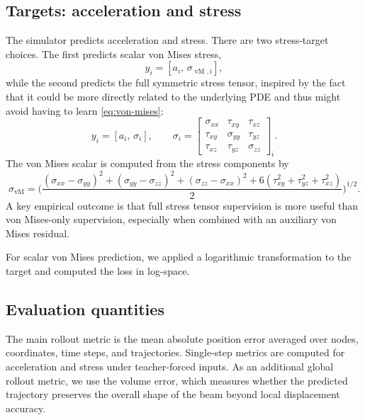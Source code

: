 \documentclass[11pt,a4paper,reqno]{amsart}
\theoremstyle{definition}
\theoremstyle{remark}
\numberwithin{equation}{section}
\newcommand{\vM}{\operatorname{vM}}
\begin{document}
\subsection{Targets: acceleration and stress}

The simulator predicts acceleration and stress. There are two stress-target choices. The first predicts scalar von Mises stress,
\begin{equation}
    y_i = \left[a_i,\, \sigma_{\vM,i}\right],
\end{equation}
while the second predicts the full symmetric stress tensor, inspired by the fact that it could be more directly related to the underlying PDE and thus might avoid having to learn \eqref{eq:von-mises}:
\begin{equation}
    y_i = \left[a_i,\, \sigma_i\right],
    \qquad
    \sigma_i =
    \begin{bmatrix}
        \sigma_{xx} & \tau_{xy} & \tau_{xz}\\
        \tau_{xy} & \sigma_{yy} & \tau_{yz}\\
        \tau_{xz} & \tau_{yz} & \sigma_{zz}
    \end{bmatrix}_i.
\end{equation}
The von Mises scalar is computed from the stress components by
\begin{equation}
    \sigma_{\vM}=\biggl(
        \frac{(\sigma_{xx}-\sigma_{yy})^2
        +(\sigma_{yy}-\sigma_{zz})^2
        +(\sigma_{zz}-\sigma_{xx})^2
        +6(\tau_{xy}^2+\tau_{yz}^2+\tau_{xz}^2)}{2}
    \biggr)^{1/2}.
    \label{eq:von-mises}
\end{equation}
A key empirical outcome is that full stress tensor supervision is more useful than von Mises-only supervision, especially when combined with an auxiliary von Mises residual.

For scalar von Mises prediction, we applied a logarithmic transformation to the target and computed the loss in log-space. 

\subsection{Evaluation quantities}

The main rollout metric is the mean absolute position error averaged over nodes, coordinates, time steps, and trajectories. Single-step metrics are computed for acceleration and stress under teacher-forced inputs. As an additional global rollout metric, we use the volume error, which measures whether the predicted trajectory preserves the overall shape of the beam beyond local displacement accuracy.
\end{document}
